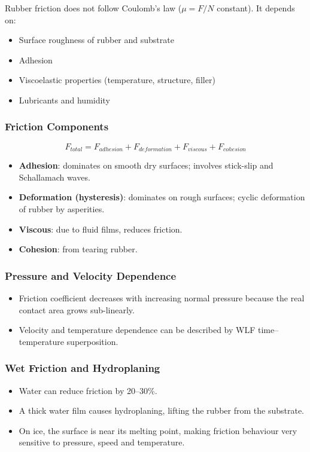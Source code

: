 \documentclass{NoteThesis/note-thesis}
\begin{document}
Rubber friction does not follow Coulomb's law ($\mu = F/N$ constant). It depends on:

\begin{itemize}
    \item Surface roughness of rubber and substrate
    \item Adhesion
    \item Viscoelastic properties (temperature, structure, filler)
    \item Lubricants and humidity
\end{itemize}

\subsubsection*{Friction Components}

\[
F_{total} = F_{adhesion} + F_{deformation} + F_{viscous} + F_{cohesion}
\]

\begin{itemize}
    \item \textbf{Adhesion}: dominates on smooth dry surfaces; involves stick-slip and Schallamach waves.
    \item \textbf{Deformation (hysteresis)}: dominates on rough surfaces; cyclic deformation of rubber by asperities.
    \item \textbf{Viscous}: due to fluid films, reduces friction.
    \item \textbf{Cohesion}: from tearing rubber.
\end{itemize}

\subsubsection*{Pressure and Velocity Dependence}

\begin{itemize}
    \item Friction coefficient decreases with increasing normal pressure because the real contact area grows sub-linearly.
    \item Velocity and temperature dependence can be described by WLF time--temperature superposition.
\end{itemize}

\subsubsection*{Wet Friction and Hydroplaning}

\begin{itemize}
    \item Water can reduce friction by 20--30\%.
    \item A thick water film causes hydroplaning, lifting the rubber from the substrate.
    \item On ice, the surface is near its melting point, making friction behaviour very sensitive to pressure, speed and temperature.
\end{itemize}
\end{document}

